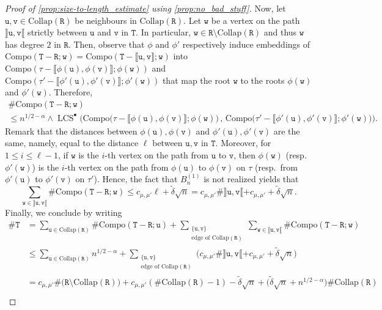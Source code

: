 \documentclass[11pt,reqno]{amsart}
\newcommand{\1}{\mathbf{1}}
\newcommand{\0}{\mathbf{0}}
\newcommand{\ttT}{\mathtt{T}}
\newcommand{\ttR}{\mathtt{R}}
\newcommand{\ttu}{\mathtt{u}}
\newcommand{\ttv}{\mathtt{v}}
\newcommand{\ttw}{\mathtt{w}}
\newcommand{\LCS}{\operatorname{LCS}}
\begin{document}
\begin{proof}[Proof of \cref{prop:size-to-length_estimate} using \cref{prop:no_bad_stuff}]
Now, let $\ttu,\ttv\in\mathrm{Collap}(\ttR)$ be neighbours in $\mathrm{Collap}(\ttR)$. Let $\ttw$ be a vertex on the path $\rrbracket \ttu,\ttv\llbracket$ strictly between $\ttu$ and $\ttv$ in $\ttT$. In particular, $\ttw\in \ttR\setminus \mathrm{Collap}(\ttR)$ and thus $\ttw$ has degree $2$ in $\ttR$. Then, observe that $\phi$ and $\phi'$ respectively induce embeddings of $\mathrm{Compo}(\ttT-\ttR;\ttw)=\mathrm{Compo}(\ttT-\llbracket\ttu,\ttv\rrbracket;\ttw)$ into $\mathrm{Compo}(\tau-\llbracket \phi(\ttu),\phi(\ttv)\rrbracket;\phi(\ttw))$ and $\mathrm{Compo}(\tau'-\llbracket \phi'(\ttu),\phi'(\ttv)\rrbracket;\phi'(\ttw))$ that map the root $\ttw$ to the roots $\phi(\ttw)$ and $\phi'(\ttw)$. Therefore,
\begin{multline*}
\#\mathrm{Compo}(\ttT-\ttR;\ttw)\\
\leq n^{1/2-\alpha}\wedge \LCS^\bullet\Big(\mathrm{Compo}\big(\tau-\llbracket \phi(\ttu),\phi(\ttv)\rrbracket;\phi(\ttw)\big)\, ,\, \mathrm{Compo}\big(\tau'-\llbracket \phi'(\ttu),\phi'(\ttv)\rrbracket;\phi'(\ttw)\big)\Big).
\end{multline*}
Remark that the distances between $\phi(\ttu),\phi(\ttv)$ and $\phi'(\ttu),\phi'(\ttv)$ are the same, namely, equal to the distance $\ell$ between $\ttu,\ttv$ in $\ttT$.
Moreover, for $1\leq i\leq \ell-1$, if $\ttw$ is the $i$-th vertex on the path from $\ttu$ to $\ttv$, then $\phi(\ttw)$ (resp.~$\phi'(\ttw)$) is the $i$-th vertex on the path from $\phi(\ttu)$ to $\phi(\ttv)$ on $\tau$ (resp.~from $\phi'(\ttu)$ to $\phi'(\ttv)$ on $\tau'$). Hence, the fact that $B_n^{(1)}$ is not realized yields that 
\[\sum_{\ttw\in \rrbracket \ttu,\ttv\llbracket}\#\mathrm{Compo}(\ttT-\ttR;\ttw)\leq c_{\mu,\mu'}\ell+\tilde{\delta}\sqrt{n}=c_{\mu,\mu'}\#\rrbracket \ttu,\ttv\llbracket+c_{\mu,\mu'}+\tilde{\delta}\sqrt{n}.\]
Finally, we conclude by writing
\begin{align*}
\#\ttT&=\sum_{\ttu\in\mathrm{Collap}(\ttR)}\#\mathrm{Compo}(\ttT-\ttR;\ttu)+\sum_{\substack{\{\ttu,\ttv\}\\ \text{edge of }\mathrm{Collap}(\ttR)}}\sum_{\ttw\in\rrbracket \ttu,\ttv\llbracket}\#\mathrm{Compo}(\ttT-\ttR;\ttw)\\
&\leq \sum_{\ttu\in\mathrm{Collap}(\ttR)}n^{1/2-\alpha}+\sum_{\substack{\{\ttu,\ttv\}\\ \text{edge of }\mathrm{Collap}(\ttR)}}\big(c_{\mu,\mu'}\#\rrbracket \ttu,\ttv\llbracket+c_{\mu,\mu'}+\tilde{\delta}\sqrt{n}\big)\\
&=c_{\mu,\mu'}\#\big(\ttR\setminus \mathrm{Collap}(\ttR)\big) +c_{\mu,\mu'}(\#\mathrm{Collap}(\ttR)-1) -\tilde{\delta}\sqrt{n}+\big(\tilde{\delta}\sqrt{n}+n^{1/2-\alpha}\big)\#\mathrm{Collap}(\ttR)\\

\end{align*}
\end{proof}
\end{document}
